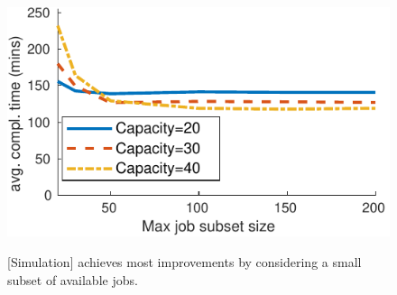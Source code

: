 \begin{figure}[H]
	\centering
	{\includegraphics[width=0.9\linewidth]{figs/analysis_N_max_ext}}
	\caption{[Simulation] \name achieves most improvements by considering a small subset of available jobs. }
	\label{fig:analysis_N_max}
\end{figure}